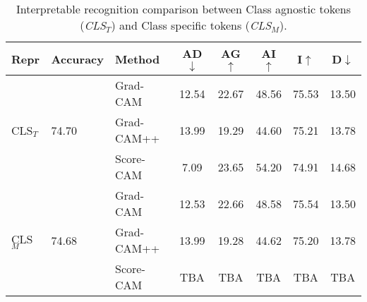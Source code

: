 \begin{table}
    \centering
    \scriptsize
    \setlength{\tabcolsep}{2.5pt}
    \begin{tabular}{lllccccc}\toprule                    
        Repr&Accuracy&Method&AD$\downarrow$&AG$\uparrow$&AI$\uparrow$&I$\uparrow$&D$\downarrow$\\\midrule
        \multirow{3}{*}{CLS$_T$}&\multirow{3}{*}{74.70}&Grad-CAM&12.54&22.67&48.56&75.53&13.50\\
            & &Grad-CAM++&13.99&19.29&44.60&75.21&13.78\\
            & &Score-CAM&7.09&23.65&54.20&74.91&14.68\\\midrule
            \multirow{3}{*}{CLS$_M$}&\multirow{3}{*}{74.68}&Grad-CAM&12.53&22.66&48.58&75.54&13.50\\
            & &Grad-CAM++&13.99&19.28&44.62&75.20&13.78\\
            & &Score-CAM&TBA&TBA&TBA&TBA&TBA\\\bottomrule
    \end{tabular}
    \vspace{3pt}
    \caption{Interpretable recognition comparison between Class agnostic tokens (\emph{CLS$_T$}) and Class specific tokens (\emph{CLS$_M$}).}
    \label{tab:TokenvMatrix}
\end{table}